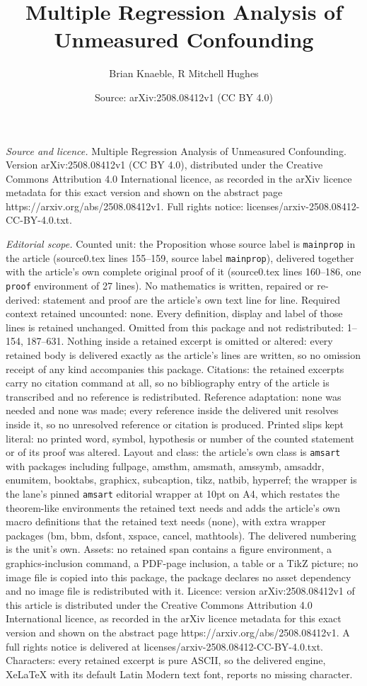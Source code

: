 \documentclass[10pt,a4paper]{amsart}
\title[Multiple Regression Analysis of Unmeasured Confounding]{Multiple Regression Analysis of Unmeasured Confounding}
\author{Brian Knaeble, R Mitchell Hughes}
\date{Source: arXiv:2508.08412v1 (CC BY 4.0)}
\begin{document}
\maketitle

\noindent\emph{Source and licence.} Multiple Regression Analysis of Unmeasured Confounding. Version arXiv:2508.08412v1 (CC BY 4.0), distributed under the Creative Commons Attribution 4.0 International licence, as recorded in the arXiv licence metadata for this exact version and shown on the abstract page https://arxiv.org/abs/2508.08412v1. Full rights notice: licenses/arxiv-2508.08412-CC-BY-4.0.txt.\par\smallskip

\noindent\textit{Editorial scope.} Counted unit: the Proposition whose source label is \texttt{mainprop} in the article (source0.tex lines 155--159, source label \texttt{mainprop}), delivered together with the article's own complete original proof of it (source0.tex lines 160--186, one \texttt{proof} environment of 27 lines). No mathematics is written, repaired or re-derived: statement and proof are the article's own text line for line. Required context retained uncounted: none. Every definition, display and label of those lines is retained unchanged. Omitted from this package and not redistributed: 1--154, 187--631. Nothing inside a retained excerpt is omitted or altered: every retained body is delivered exactly as the article's lines are written, so no omission receipt of any kind accompanies this package. Citations: the retained excerpts carry no citation command at all, so no bibliography entry of the article is transcribed and no reference is redistributed. Reference adaptation: none was needed and none was made; every reference inside the delivered unit resolves inside it, so no unresolved reference or citation is produced. Printed slips kept literal: no printed word, symbol, hypothesis or number of the counted statement or of its proof was altered. Layout and class: the article's own class is \texttt{amsart} with packages including fullpage, amsthm, amsmath, amssymb, amsaddr, enumitem, booktabs, graphicx, subcaption, tikz, natbib, hyperref; the wrapper is the lane's pinned \texttt{amsart} editorial wrapper at 10pt on A4, which restates the theorem-like environments the retained text needs and adds the article's own macro definitions that the retained text needs (none), with extra wrapper packages (bm, bbm, dsfont, xspace, cancel, mathtools). The delivered numbering is the unit's own. Assets: no retained span contains a figure environment, a graphics-inclusion command, a PDF-page inclusion, a table or a TikZ picture; no image file is copied into this package, the package declares no asset dependency and no image file is redistributed with it. Licence: version arXiv:2508.08412v1 of this article is distributed under the Creative Commons Attribution 4.0 International licence, as recorded in the arXiv licence metadata for this exact version and shown on the abstract page https://arxiv.org/abs/2508.08412v1. A full rights notice is delivered at licenses/arxiv-2508.08412-CC-BY-4.0.txt. Characters: every retained excerpt is pure ASCII, so the delivered engine, XeLaTeX with its default Latin Modern text font, reports no missing character.
\end{document}
